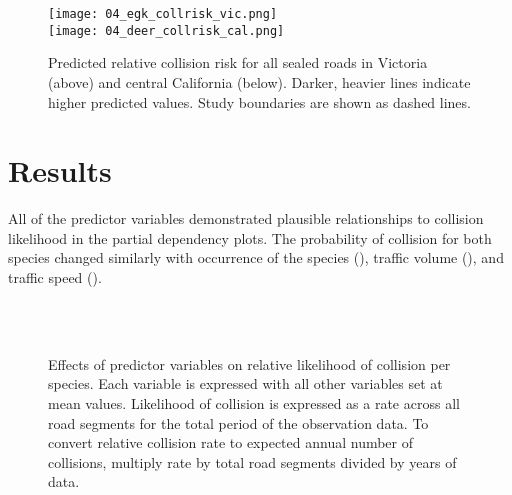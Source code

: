 \begin{figure*}[htp]
  \centering
  \texttt{[image: 04\_egk\_collrisk\_vic.png]}\\
  \texttt{[image: 04\_deer\_collrisk\_cal.png]}
  \caption[Predicted relative collision risk for all sealed roads in Victoria and central California]{Predicted relative collision risk for all sealed roads in Victoria (above) and central California (below).  Darker, heavier lines indicate higher predicted values. Study boundaries are shown as dashed lines.}
  \label{cal_coll_preds}
\end{figure*}

\section{Results}

All of the predictor variables demonstrated plausible relationships to collision likelihood in the partial dependency plots. The probability of collision for both species changed similarly with occurrence of the species (), traffic volume (), and traffic speed ().

\begin{figure*}[htp]
  \captionsetup[subfloat]{farskip=-2pt,nearskip=-2pt}
  \centering
  \\
  \\
  \caption[Marginal effects of predictor variables on relative likelihood of collision for kangaroos and deer]{Effects of predictor variables on relative likelihood of collision per species.  Each variable is expressed with all other variables set at mean values.  Likelihood of collision is expressed as a rate across all road segments for the total period of the observation data.  To convert relative collision rate to expected annual number of collisions, multiply rate by total road segments divided by years of data.}
  \label{cal_coll_effects}
\end{figure*}

